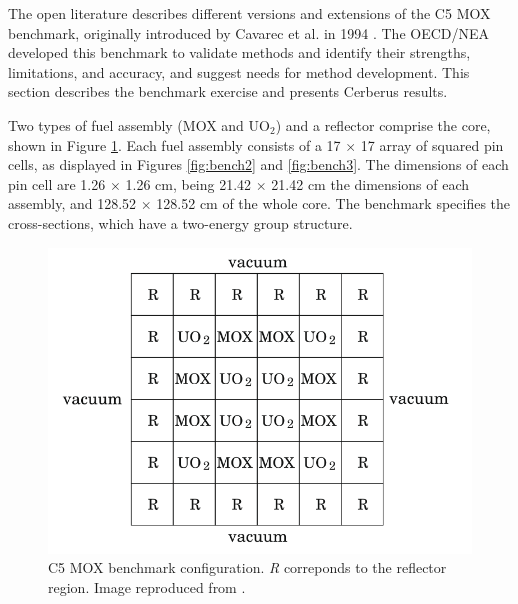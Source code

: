 \documentclass{anstrans}
\begin{document}
The open literature describes different versions and extensions of the C5 MOX benchmark, originally introduced by Cavarec et al. in 1994 \cite{cavarec_benchmark_1994}.
The \gls{OECD}/\gls{NEA} developed this benchmark to validate methods and identify their strengths, limitations, and accuracy, and suggest needs for method development.
This section describes the benchmark exercise and presents Cerberus results.

Two types of fuel assembly (MOX and UO$_2$) and a reflector comprise the core, shown in Figure \ref{fig:bench1}.
Each fuel assembly consists of a 17 $\times$ 17 array of squared pin cells, as displayed in Figures \ref{fig:bench2} and \ref{fig:bench3}.
The dimensions of each pin cell are 1.26 $\times$ 1.26 cm, being 21.42 $\times$ 21.42 cm the dimensions of each assembly, and 128.52 $\times$ 128.52 cm of the whole core.
The benchmark \cite{cavarec_benchmark_1994} specifies the cross-sections, which have a two-energy group structure.

\begin{figure}[htbp!] %
    \centering
    \includegraphics[width=0.85\linewidth]{figures/bench-config.png}
    \hfill
    \caption{C5 MOX benchmark configuration. \textit{R} correponds to the reflector region. Image reproduced from \cite{capilla_applications_2009}.}
    \label{fig:bench1}
\end{figure}
\end{document}
